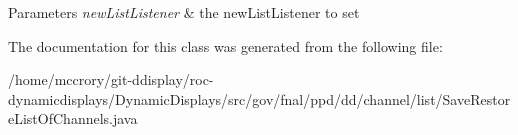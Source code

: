 \begin{DoxyParams}{Parameters}
{\em new\-List\-Listener} & the new\-List\-Listener to set \\
\hline
\end{DoxyParams}


The documentation for this class was generated from the following file\-:\begin{DoxyCompactItemize}
\item 
/home/mccrory/git-\/ddisplay/roc-\/dynamicdisplays/\-Dynamic\-Displays/src/gov/fnal/ppd/dd/channel/list/Save\-Restore\-List\-Of\-Channels.\-java\end{DoxyCompactItemize}
